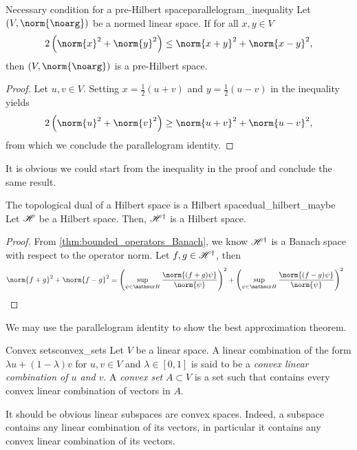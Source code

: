 \begin{lemma}{Necessary condition for a pre-Hilbert space}{parallelogram_inequality}
    Let \((V, \norm{\noarg})\) be a normed linear space. If for all \(x,y \in V\)
    \begin{equation*}
        2\left(\norm{x}^2 + \norm{y}^2\right) \leq \norm{x+y}^2 + \norm{x - y}^2,
    \end{equation*}
    then \((V, \norm{\noarg})\) is a pre-Hilbert space.
\end{lemma}
\begin{proof}
    Let \(u, v \in V\). Setting \(x = \frac12(u + v)\) and \(y = \frac12(u - v)\) in the inequality yields
    \begin{equation*}
        2\left(\norm{u}^2 + \norm{v}^2\right) \geq \norm{u+v}^2 + \norm{u - v}^2,
    \end{equation*}
    from which we conclude the parallelogram identity.
\end{proof}
\begin{remark}
    It is obvious we could start from the inequality in the proof and conclude the same result.
\end{remark}
\begin{theorem}{The topological dual of a Hilbert space is a Hilbert space}{dual_hilbert_maybe}
    Let \(\mathscr{H}\) be a Hilbert space. Then, \(\mathscr{H}^\dag\) is a Hilbert space.
\end{theorem}
\begin{proof}
From \cref{thm:bounded_operators_Banach}, we know \(\mathscr{H}^\dag\) is a Banach space with respect to the operator norm. Let \(f, g \in \mathscr{H}^\dag\), then
    \begin{align*}
        \norm{f + g}^2 + \norm{f - g}^2 &= \left(\sup_{\psi \in \hilbert}\frac{\norm{(f+g)\psi}}{\norm{\psi}}\right)^2 + \left(\sup_{\psi \in \hilbert}\frac{\norm{(f-g)\psi}}{\norm{\psi}}\right)^2
    \end{align*}
\end{proof}

We may use the parallelogram identity to show the best approximation theorem.
\begin{definition}{Convex sets}{convex_sets}
    Let \(V\) be a linear space. A linear combination of the form \(\lambda u + (1 - \lambda)v\) for \(u, v \in V\) and \(\lambda \in [0,1]\) is said to be a \emph{convex linear combination of \(u\) and \(v\)}. A \emph{convex set} \(A \subset V\) is a set such that contains every convex linear combination of vectors in \(A\).
\end{definition}
\begin{remark}
    It should be obvious linear subspaces are convex spaces. Indeed, a subspace contains any linear combination of its vectors, in particular it contains any convex linear combination of its vectors.
\end{remark}

